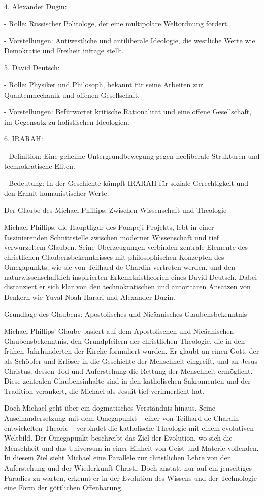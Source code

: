 \documentclass[
]{article}
\begin{document}
4. Alexander Dugin:

- Rolle: Russischer Politologe, der eine multipolare Weltordnung
fordert.

- Vorstellungen: Antiwestliche und antiliberale Ideologie, die westliche
Werte wie Demokratie und Freiheit infrage stellt.

5. David Deutsch:

- Rolle: Physiker und Philosoph, bekannt für seine Arbeiten zur
Quantenmechanik und offenen Gesellschaft.

- Vorstellungen: Befürwortet kritische Rationalität und eine offene
Gesellschaft, im Gegensatz zu holistischen Ideologien.

6. IRARAH:

- Definition: Eine geheime Untergrundbewegung gegen neoliberale
Strukturen und technokratische Eliten.

- Bedeutung: In der Geschichte kämpft IRARAH für soziale Gerechtigkeit
und den Erhalt humanistischer Werte.

Der Glaube des Michael Phillips: Zwischen Wissenschaft und Theologie

Michael Phillips, die Hauptfigur des Pompeji-Projekts, lebt in einer
faszinierenden Schnittstelle zwischen moderner Wissenschaft und tief
verwurzeltem Glauben. Seine Überzeugungen verbinden zentrale Elemente
des christlichen Glaubensbekenntnisses mit philosophischen Konzepten des
Omegapunkts, wie sie von Teilhard de Chardin vertreten werden, und den
naturwissenschaftlich inspirierten Erkenntnistheorien eines David
Deutsch. Dabei distanziert er sich klar von den technokratischen und
autoritären Ansätzen von Denkern wie Yuval Noah Harari und Alexander
Dugin.

Grundlage des Glaubens: Apostolisches und Nicäanisches
Glaubensbekenntnis

Michael Phillips' Glaube basiert auf dem Apostolischen und Nicäanischen
Glaubensbekenntnis, den Grundpfeilern der christlichen Theologie, die in
den frühen Jahrhunderten der Kirche formuliert wurden. Er glaubt an
einen Gott, der als Schöpfer und Erlöser in die Geschichte der
Menschheit eingreift, und an Jesus Christus, dessen Tod und Auferstehung
die Rettung der Menschheit ermöglicht. Diese zentralen Glaubensinhalte
sind in den katholischen Sakramenten und der Tradition verankert, die
Michael als Jesuit tief verinnerlicht hat.

Doch Michael geht über ein dogmatisches Verständnis hinaus. Seine
Auseinandersetzung mit dem Omegapunkt -- einer von Teilhard de Chardin
entwickelten Theorie -- verbindet die katholische Theologie mit einem
evolutiven Weltbild. Der Omegapunkt beschreibt das Ziel der Evolution,
wo sich die Menschheit und das Universum in einer Einheit von Geist und
Materie vollenden. In diesem Ziel sieht Michael eine Parallele zur
christlichen Lehre von der Auferstehung und der Wiederkunft Christi.
Doch anstatt nur auf ein jenseitiges Paradies zu warten, erkennt er in
der Evolution des Wissens und der Technologie eine Form der göttlichen
Offenbarung.
\end{document}
